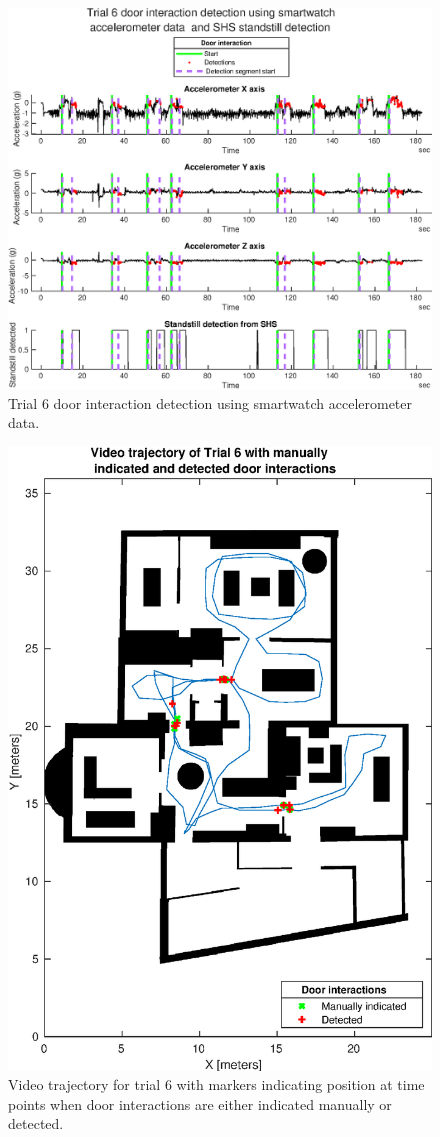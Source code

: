 \begin{figure}[H]
	\centering
	\includegraphics[width=0.8\linewidth]{images/20201201_1506_Trial_6_door_interaction_detection_using_smartwatch_1}
	\setlength{\belowcaptionskip}{-20pt}
	\caption{Trial 6 door interaction detection using smartwatch accelerometer data.}
	\label{fig:202011292141trial6doorinteractiondetectionusingsmartwatch1}
\end{figure}
\begin{figure}[H]
	\centering
	\includegraphics[width=0.7\linewidth]{images/20201129_2332_video_traj_Trial_6_door_detect_vs_manual_1}
	\setlength{\belowcaptionskip}{-20pt}
	\caption{Video trajectory for trial 6 with markers indicating position at time points when door interactions are either indicated manually or detected.}
	\label{fig:202011292332videotrajtrial6doordetectvsmanual1}
\end{figure}



